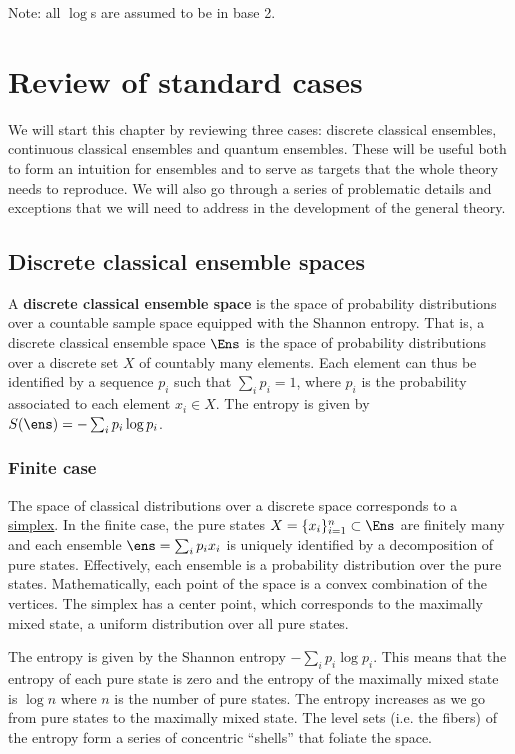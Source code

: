 Note: all $\log$s are assumed to be in base 2.

\section{Review of standard cases}

We will start this chapter by reviewing three cases: discrete classical ensembles, continuous classical ensembles and quantum ensembles. These will be useful both to form an intuition for ensembles and to serve as targets that the whole theory needs to reproduce. We will also go through a series of problematic details and exceptions that we will need to address in the development of the general theory.

\subsection{Discrete classical ensemble spaces}

\begin{defn}
	A \textbf{discrete classical ensemble space} is the space of probability distributions over a countable sample space equipped with the Shannon entropy. That is, a discrete classical ensemble space $\Ens$ is the space of probability distributions over a discrete set $X$ of countably many elements. Each element can thus be identified by a sequence $p_i$ such that $\sum_i p_i = 1$, where $p_i$ is the probability associated to each element $x_i \in X$. The entropy is given by $S(\ens) = - \sum_i p_i \log p_i$.
\end{defn}

\subsubsection{Finite case}

The space of classical distributions over a discrete space corresponds to a \href{https://en.wikipedia.org/wiki/Simplex}{simplex}. In the finite case, the pure states $X = \{x_i\}_{i=1}^{n} \subset \Ens$ are finitely many and each ensemble $\ens = \sum_i p_i x_i$ is uniquely identified by a decomposition of pure states. Effectively, each ensemble is a probability distribution over the pure states. Mathematically, each point of the space is a convex combination of the vertices. The simplex has a center point, which corresponds to the maximally mixed state, a uniform distribution over all pure states. 

The entropy is given by the Shannon entropy $-\sum_i p_i \log p_i$. This means that the entropy of each pure state is zero and the entropy of the maximally mixed state is $\log n$ where $n$ is the number of pure states. The entropy increases as we go from pure states to the maximally mixed state. The level sets (i.e. the fibers) of the entropy form a series of concentric ``shells'' that foliate the space.

